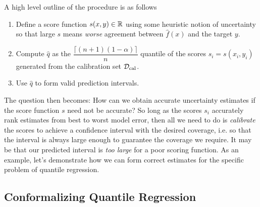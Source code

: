 A high level outline of the procedure is as follows
\begin{enumerate}
\item Define a score function $s(x,y)\in\mathbb{R}$ using some heuristic notion of uncertainty so that large $s$ means \textit{worse} agreement between $\hat{f}(x)$ and the target $y$.
\item Compute $\hat{q}$ as the $\dfrac{\lceil (n+1)(1-\alpha) \rceil}{n}$ quantile of the scores $s_i = s(x_i, y_i)$ generated from the calibration set $\mathcal{D}_{\text{cal}}$.
  \item Use $\hat{q}$ to form valid prediction intervals.
\end{enumerate}

The question then becomes: How can we obtain accurate uncertainty estimates if the score function $s$ need not be accurate? So long as the scores $s_i$ accurately rank estimates from best to worst model error, then all we need to do is \textit{calibrate} the scores to achieve a confidence interval with the desired coverage, i.e. so that the interval is always large enough to guarantee the coverage we require. It may be that our predicted interval is \textit{too large} for a poor scoring function. As an example, let's demonstrate how we can form correct estimates for the specific problem of quantile regression.

\subsection{Conformalizing Quantile Regression}

